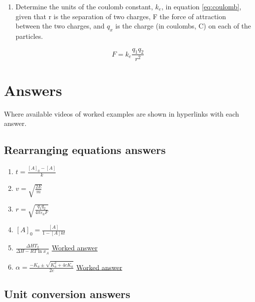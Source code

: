 \documentclass[
]{book}
\providecommand{\tightlist}{%
  \setlength{\itemsep}{0pt}\setlength{\parskip}{0pt}}
\begin{document}
\begin{enumerate}
\def\labelenumi{\arabic{enumi}.}
\setcounter{enumi}{3}
\tightlist
\item
  Determine the units of the coulomb constant, \(k_e\), in equation \eqref{eq:coulomb}, given that r is the separation of two charges, F the force of attraction between the two charges, and \(q_x\) is the charge (in coulombs, C) on each of the particles.
\end{enumerate}

\begin{equation}
F = k_e \frac{q_1 q_2}{r^2}
\label{eq:coulomb}
\end{equation}

\hypertarget{sec:Answers}{%
\section{Answers}\label{sec:Answers}}

Where available videos of worked examples are shown in hyperlinks with each answer.

\hypertarget{subsec:rearrangeans}{%
\subsection{Rearranging equations answers}\label{subsec:rearrangeans}}

\begin{enumerate}
\def\labelenumi{\arabic{enumi}.}
\item
  \(t =\frac{[A]_0-[A]}{k}\)
\item
  \(v = \sqrt {\frac{2E}{m}}\)
\item
  \(r = \sqrt{\frac{q_1 q_2}{4 \pi \varepsilon_0 F }}\)
\item
  \([A]_0=\frac{[A]}{1-[A]kt}\)
\item
  \(\frac{\Delta H T_2}{\Delta H - R T \ln {x_A}}\) \href{https://www.youtube.com/embed/WmryM91dcXE}{Worked answer}
\item
  \(\alpha = \frac{-K_a \pm \sqrt{K_a^2 + 4 c K_a}}{2c}\) \href{https://www.youtube.com/embed/F7em5K2b4to}{Worked answer}
\end{enumerate}

\hypertarget{subsec:Unitconvans}{%
\subsection{Unit conversion answers}\label{subsec:Unitconvans}}
\end{document}
